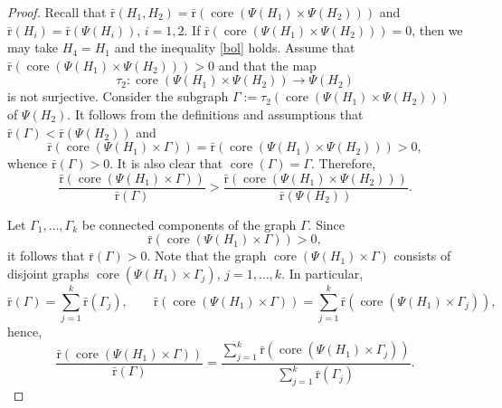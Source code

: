 \documentclass[10pt, reqno]{amsart}
\numberwithin{equation}{section}
\begin{document}
\begin{proof} Recall that  $ {\bar {\mathrm{r}}}(  H_1, H_2 )=   {\bar {\mathrm{r}}}( \operatorname{core} (\Psi(H_1) \times \Psi(H_2)) )$ and
$ {\bar {\mathrm{r}}}(  H_i) = {\bar {\mathrm{r}}}(\Psi(  H_i))$, $i=1,2$.
If ${\bar {\mathrm{r}}}( \operatorname{core} (\Psi(H_1) \times \Psi(H_2)) ) = 0$, then we may take $H_4 = H_1$ and the inequality \eqref{bol} holds.  Assume that ${\bar {\mathrm{r}}}( \operatorname{core} (\Psi(H_1) \times \Psi(H_2)) ) > 0$ and that the map
$$
\tau_2 : \operatorname{core} (\Psi(H_1) \times \Psi(H_2)) \to  \Psi(H_2)
$$
is not surjective. Consider the subgraph
$\Gamma := \tau_2 (\operatorname{core} (\Psi(H_1) \times \Psi(H_2)) ) $ of $\Psi(H_2)$. It follows from the definitions and assumptions that ${\bar {\mathrm{r}}}(\Gamma) < {\bar {\mathrm{r}}} (\Psi(H_2))$ and
$$
{\bar {\mathrm{r}}}(  \operatorname{core} (\Psi(H_1) \times \Gamma )  ) = {\bar {\mathrm{r}}}(  \operatorname{core} (\Psi(H_1) \times \Psi(H_2))  ) >0,
$$
whence $ {\bar {\mathrm{r}}}( \Gamma ) > 0$. It is also clear that $\operatorname{core}(\Gamma  ) = \Gamma $.
Therefore,
\begin{equation}\label{e52}
\frac{{\bar {\mathrm{r}}}( \operatorname{core} (  \Psi(H_1) \times \Gamma   ))  }{  {\bar {\mathrm{r}}}(\Gamma ) }  > \frac{{\bar {\mathrm{r}}}( \operatorname{core} (  \Psi(H_1) \times \Psi(H_2)   ))  }{  {\bar {\mathrm{r}}}(\Psi(H_2) ) } .
\end{equation}

Let $\Gamma_1, \dots, \Gamma_k$  be  connected components of the graph $\Gamma $.
Since
$$
{\bar {\mathrm{r}}}( \operatorname{core} (  \Psi(H_1) \times \Gamma )) >0 ,
$$ it follows  that  ${\bar {\mathrm{r}}}( \Gamma ) >0$.
Note that the graph
$
\operatorname{core} (  \Psi(H_1) \times \Gamma )
$
consists of disjoint graphs $\operatorname{core} (  \Psi(H_1) \times \Gamma_j )$, $j=1, \dots, k$.
In particular,
$$
{\bar {\mathrm{r}}}(\Gamma) = \sum_{j=1}^k {\bar {\mathrm{r}}}(\Gamma_j) , \qquad   {\bar {\mathrm{r}}}( \operatorname{core} (  \Psi(H_1) \times \Gamma )) = \sum_{j=1}^k {\bar {\mathrm{r}}}( \operatorname{core} (  \Psi(H_1) \times \Gamma_j )) ,
$$
 hence,
\begin{equation}\label{e53}
\frac{{\bar {\mathrm{r}}}( \operatorname{core} (  \Psi(H_1) \times \Gamma   ))  }{  {\bar {\mathrm{r}}}(\Gamma ) } =  \frac{ \sum_{j=1}^k {\bar {\mathrm{r}}}( \operatorname{core} (  \Psi(H_1) \times \Gamma_j )) }{     \sum_{j=1}^k {\bar {\mathrm{r}}}(  \Gamma_j )      } .
\end{equation}


\end{proof}
\end{document}
